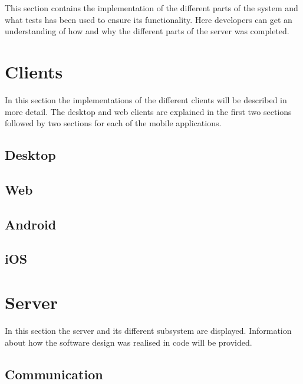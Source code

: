 
This section contains the implementation of the different parts of the system and what tests has been used to ensure its functionality. Here developers can get an understanding of how and why the different parts of the server was completed.

\section{Clients}

In this section the implementations of the different clients will be described
in more detail. The desktop and web clients are explained in the first two
sections followed by two sections for each of the mobile applications.

\subsection{Desktop}

\FloatBarrier

\subsection{Web}

\FloatBarrier

\subsection{Android}

\FloatBarrier

\subsection{iOS}

\FloatBarrier

\section{Server}

In this section the server and its different subsystem are displayed.
Information about how the software design was realised in code will be provided.

\subsection{Communication}

\FloatBarrier

